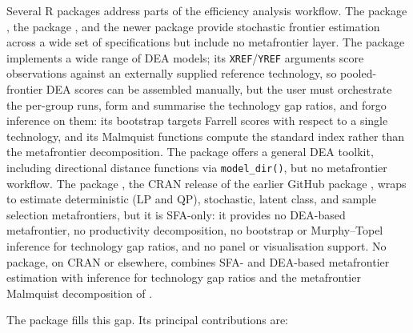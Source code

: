 Several \textsf{R} \citep{R} packages address parts of the efficiency analysis
workflow. The  package \citep{frontier}, the 
package \citep{sfaR}, and the newer  package \citep{sfa} provide
stochastic frontier estimation across a wide set of specifications but
include no metafrontier layer. The  package \citep{bogetoft2011} implements a wide
range of DEA models; its \texttt{XREF}/\texttt{YREF} arguments score observations against
an externally supplied reference technology, so pooled-frontier DEA scores
can be assembled manually, but the user must orchestrate the per-group runs,
form and summarise the technology gap ratios, and forgo inference on them:
its bootstrap targets Farrell scores with respect to a single technology,
and its Malmquist functions compute the standard index rather than the
metafrontier decomposition. The  package \citep{deaR} offers a
general DEA toolkit, including directional distance functions via
\texttt{model\_dir()}, but no metafrontier workflow. The  package
\citep{smfa}, the CRAN release of the earlier GitHub package 
\citep{metafrontieR}, wraps  to estimate deterministic (LP and QP),
stochastic, latent class, and sample selection \citep{greene2010} metafrontiers,
but it is SFA-only: it provides no DEA-based metafrontier, no productivity
decomposition, no bootstrap or Murphy--Topel inference for technology gap
ratios, and no panel or visualisation support. No package, on CRAN or
elsewhere, combines SFA- and DEA-based metafrontier estimation with
inference for technology gap ratios and the metafrontier Malmquist
decomposition of \citet{odonnell2008}.

The  package fills this gap. Its principal contributions
are:

